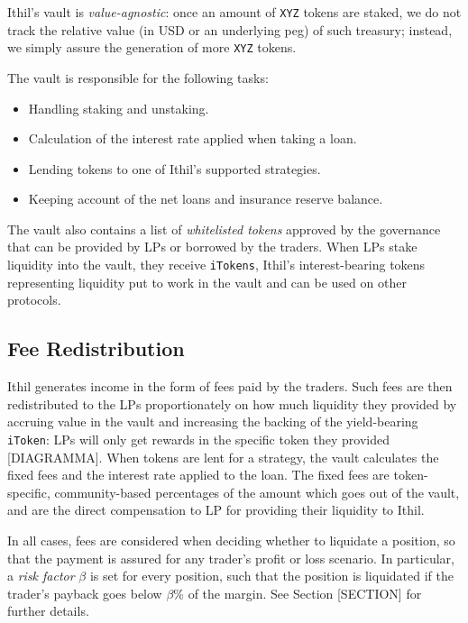 \documentclass[a4paper,10 pt]{article}
\theoremstyle{definition}
\begin{document}
Ithil's vault is \textit{value-agnostic}: once an amount of \verb|XYZ| tokens are staked, we do not track the relative value (in USD or an underlying peg) of such treasury; instead, we simply assure the generation of more \verb|XYZ| tokens.

The vault is responsible for the following tasks:
\begin{itemize}
\item Handling staking and unstaking.
\item Calculation of the interest rate applied when taking a loan.
\item Lending tokens to one of Ithil’s supported strategies.
\item Keeping account of the net loans and insurance reserve balance.
\end{itemize}

The vault also contains a list of {\it whitelisted tokens} approved by the governance that can be provided by LPs or borrowed by the traders. When LPs stake liquidity into the vault, they receive \verb|iTokens|, Ithil's interest-bearing tokens representing liquidity put to work in the vault and can be used on other protocols.

\subsection{Fee Redistribution}

Ithil generates income in the form of fees paid by the traders. Such fees are then redistributed to the LPs proportionately on how much liquidity they provided by accruing value in the vault and increasing the backing of the yield-bearing \verb|iToken|: LPs will only get rewards in the specific token they provided [DIAGRAMMA]. When tokens are lent for a strategy, the vault calculates the fixed fees and the interest rate applied to the loan. The fixed fees are token-specific, community-based percentages of the amount which goes out of the vault, and are the direct compensation to LP for providing their liquidity to Ithil. 

In all cases, fees are considered when deciding whether to liquidate a position, so that the payment is assured for any trader's profit or loss scenario. In particular, a \textit{risk factor} $\beta$ is set for every position, such that the position is liquidated if the trader's payback goes below $\beta$\% of the margin. See Section [SECTION] for further details.
\end{document}
